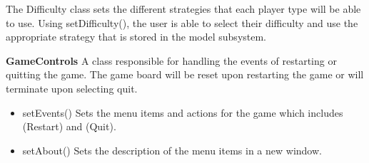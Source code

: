 The Difficulty class sets the different strategies that each player type will be able to use. Using setDifficulty(), the user is able to select their difficulty and use the appropriate strategy that is stored in the model subsystem. 

\textbf{GameControls} A class responsible for handling the events of restarting or quitting the game. The game board will be reset upon restarting the game or will terminate upon selecting quit.
\begin{itemize}
  \item setEvents() Sets the menu items and actions for the game which includes (Restart) and (Quit).
  \item setAbout() Sets the description of the menu items in a new window.
\end{itemize}



\newpage
